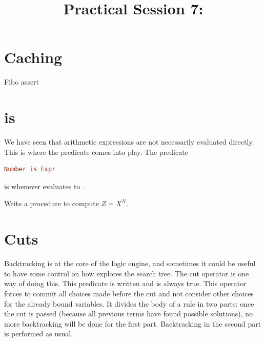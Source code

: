 \documentclass{../../../tp}
\title{Practical Session 7: \prolog}
\author{}
\begin{document}
	
\maketitle

\section{Caching}

Fibo assert
	
\section{is}	

We have seen that arithmetic expressions are not necessarily evaluated directly. This is where the  predicate comes into play. 
The predicate

\begin{lstlisting}[language=prolog]
	Number is Expr
\end{lstlisting} 

is  whenever  evaluates to . 


\begin{instruction}
	Write a  procedure to compute $Z = X^N$. 
	
\end{instruction}


\section{Cuts}

Backtracking is at the core of the logic engine, and sometimes it could be useful to have some control on how \prolog explores the search tree. The cut operator is one way of doing this. This predicate is written \prologcode{!} and is always true. This operator forces \prolog to commit all choices made before the cut and not consider other choices for the already bound variables. It divides the body of a rule in two parts: once the cut is passed (because all previous terms have found possible solutions), no more backtracking will be done for the first part. Backtracking in the second part is performed as usual.
\end{document}
